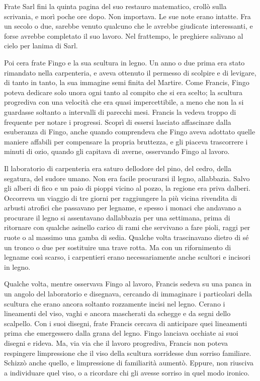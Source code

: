 Frate Sarl fini la quinta pagina del suo restauro matematico, crollò
sulla scrivania, e morì poche ore dopo. Non importava. Le sue note erano
intatte. Fra un secolo o due, sarebbe venuto qualcuno che le avrebbe
giudicate interessanti, e forse avrebbe completato il suo lavoro. Nel
frattempo, le preghiere salivano al cielo per l\textquotesingle anima di
Sarl.

Poi c\textquotesingle era frate Fingo e la sua scultura in legno. Un
anno o due prima era stato rimandato nella carpenteria, e aveva ottenuto
il permesso di scolpire e di levigare, di tanto in tanto, la sua
immagine semi finita del Martire. Come Francis, Fingo poteva dedicare
solo un\textquotesingle ora ogni tanto al compito che si era scelto; la
scultura progrediva con una velocità che era quasi impercettibile, a
meno che non la si guardasse soltanto a intervalli di parecchi mesi.
Francis la vedeva troppo di frequente per notare i progressi. Scoprì di
essersi lasciato affascinare dalla esuberanza di Fingo, anche quando
comprendeva che Fingo aveva adottato quelle maniere affabili per
compensare la propria bruttezza, e gli piaceva trascorrere i minuti di
ozio, quando gli capitava di averne, osservando Fingo al lavoro.

Il laboratorio di carpenteria era saturo dell\textquotesingle odore del
pino, del cedro, della segatura, del sudore umano. Non era facile
procurarsi il legno, all\textquotesingle abbazia. Salvo gli alberi di
fico e un paio di pioppi vicino al pozzo, la regione era priva
d\textquotesingle alberi. Occorreva un viaggio di tre giorni per
raggiungere la più vicina rivendita di arbusti atrofici che passavano
per legname, e spesso i monaci che andavano a procurare il legno si
assentavano dall\textquotesingle abbazia per una settimana, prima di
ritornare con qualche asinello carico di rami che servivano a fare
pioli, raggi per ruote o al massimo una gamba di sedia. Qualche volta
trascinavano dietro di sé un tronco o due per sostituire una trave
rotta. Ma con un rifornimento di legname così scarso, i carpentieri
erano necessariamente anche scultori e incisori in legno.

Qualche volta, mentre osservava Fingo al lavoro, Francis sedeva su una
panca in un angolo del laboratorio e disegnava, cercando di immaginare i
particolari della scultura che erano ancora soltanto rozzamente incisi
nel legno. C\textquotesingle erano i lineamenti del viso, vaghi e ancora
mascherati da schegge e da segni dello scalpello. Con i suoi disegni,
frate Francis cercava di anticipare quei lineamenti prima che
emergessero dalla grana del legno. Fingo lanciava occhiate ai suoi
disegni e rideva. Ma, via via che il lavoro progrediva, Francis non
poteva respingere l\textquotesingle impressione che il viso della
scultura sorridesse d\textquotesingle un sorriso familiare. Schizzò
anche quello, e l\textquotesingle impressione di familiarità aumentò.
Eppure, non riusciva a individuare quel viso, o a ricordare chi gli
avesse sorriso in quel modo ironico.

